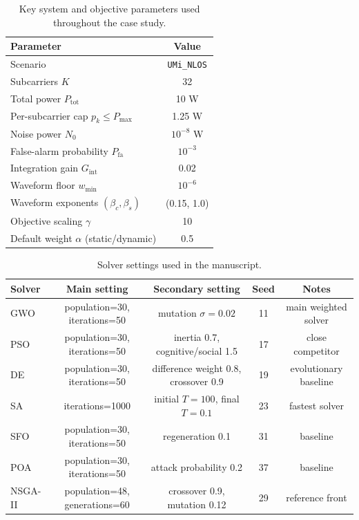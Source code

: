\documentclass[runningheads]{llncs}
\begin{document}
\begin{table}[t]
\centering
\caption{Key system and objective parameters used throughout the case study.}
\label{tab:params}
\small
\begin{tabular}{lc}
\toprule
Parameter & Value \\
\midrule
Scenario & \texttt{UMi\_NLOS} \\
Subcarriers $K$ & 32 \\
Total power $P_{\mathrm{tot}}$ & 10 W \\
Per-subcarrier cap $p_k \le P_{\max}$ & 1.25 W \\
Noise power $N_0$ & $10^{-8}$ W \\
False-alarm probability $P_{\mathrm{fa}}$ & $10^{-3}$ \\
Integration gain $G_{\mathrm{int}}$ & 0.02 \\
Waveform floor $w_{\min}$ & $10^{-6}$ \\
Waveform exponents $(\beta_c,\beta_s)$ & (0.15, 1.0) \\
Objective scaling $\gamma$ & 10 \\
Default weight $\alpha$ (static/dynamic) & 0.5 \\
\bottomrule
\end{tabular}
\end{table}

\begin{table}[t]
\centering
\caption{Solver settings used in the manuscript.}
\label{tab:settings}
\small
\begin{tabular}{lcccc}
\toprule
Solver & Main setting & Secondary setting & Seed & Notes \\
\midrule
GWO & population=30, iterations=50 & mutation $\sigma=0.02$ & 11 & main weighted solver \\
PSO & population=30, iterations=50 & inertia 0.7, cognitive/social 1.5 & 17 & close competitor \\
DE & population=30, iterations=50 & difference weight 0.8, crossover 0.9 & 19 & evolutionary baseline \\
SA & iterations=1000 & initial $T=100$, final $T=0.1$ & 23 & fastest solver \\
SFO & population=30, iterations=50 & regeneration 0.1 & 31 & baseline \\
POA & population=30, iterations=50 & attack probability 0.2 & 37 & baseline \\
NSGA-II & population=48, generations=60 & crossover 0.9, mutation 0.12 & 29 & reference front \\
\bottomrule
\end{tabular}
\end{table}
\end{document}
